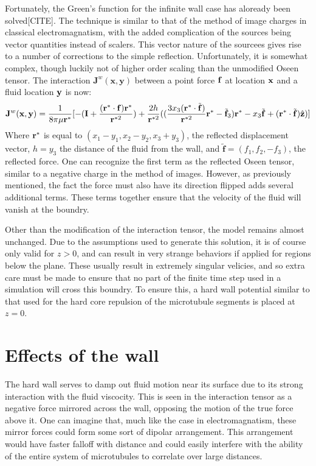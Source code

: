 \documentclass[11pt]{ucthesis}
\def\br{{\bf r}}
\begin{document}
Fortunately, the Green's function for the infinite wall case has aloready been solved[CITE]. The technique is  similar to that of the method of image charges in classical electromagnatism, with the added complication of the sources being vector quantities instead of scalers. This vector nature of the sourcees gives rise to a number of corrections to the simple reflection.
Unfortunately, it is somewhat complex, though luckily not of higher order scaling than the unmodified Oseen tensor. The interaction $\mathbf{J}^w(\mathbf{x},\mathbf{y})$ between a point force $\bf f$ at location $\bf x$ and a fluid location $\bf y$ is now:
\begin{equation}
\label{eq:oseenwall}
\mathbf{J}^w(\mathbf{x}, \mathbf{y}) = \frac{1}{8\pi\mu \br^*} [ 
- (\mathbf{I} + \frac{(\br^*\cdot\mathbf{f})\br^*}{\br^{*2}}) 
+ \frac{2 h}{\br^{*2}}( (\frac{3 x_3(\br^*\cdot\tilde{\mathbf{f}})}{\br^{*2}} \br^* - \tilde{\mathbf{f}}_3)\br^* - x_3\tilde{\mathbf{f}} + (\br^*\cdot\tilde{\mathbf{f}})\hat{\mathbf{z}})]
\end{equation}
Where $\br^*$ is equal to $(x_1-y_1,x_2-y_2,x_3+y_3)$, the reflected displacement vector, $h = y_3$ the distance of the fluid from the wall, and $\tilde{\mathbf{f}} = (f_1,f_2,-f_3)$, the reflected force. 
One can recognize the first term as the reflected Oseen tensor, similar to a negative charge in the method of images. 
However, as previously mentioned, the fact the force must also have its direction flipped adds several additional terms. These terms together ensure that the velocity of the fluid will vanish at the boundry.

Other than the modification of the interaction tensor, the model remains almost unchanged.
Due to the assumptions used to generate this solution, it is of course only valid for $z>0$, and can result in very strange behaviors if applied for regions below the plane. 
These usually result in extremely singular velicies, and so extra care must be made to ensure that no part of the finite time step used in a simulation will cross this boundry. 
To ensure this, a hard wall potential similar to that used for the hard core repulsion of the microtubule segments is placed at $z=0$.

\section{Effects of the wall}
The hard wall serves to damp out fluid motion near its surface due to its strong interaction with the fluid viscocity. 
This is seen in the interaction tensor as a negative force mirrored across the wall, opposing the motion of the true force above it.
One can imagine that, much like the case in electromagnatism, these mirror forces could form some sort of dipolar arrangement. 
This arrangement would have faster falloff with distance and could easily interfere with the ability of the entire system of microtubules to correlate over large distances.
\end{document}
